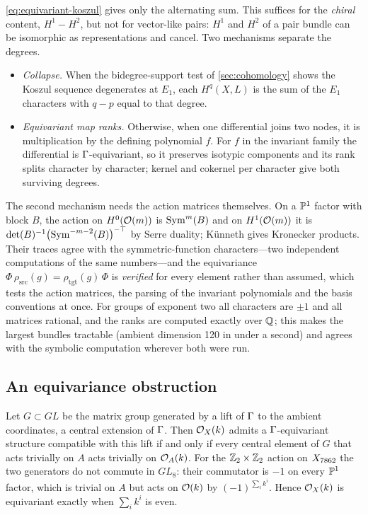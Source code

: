 \eqref{eq:equivariant-koszul} gives only the alternating sum. This suffices for
the \emph{chiral} content, $H^1-H^2$, but not for vector-like pairs: $H^1$ and
$H^2$ of a pair bundle can be isomorphic as representations and cancel. Two
mechanisms separate the degrees.

\begin{itemize}[leftmargin=*]
\item \emph{Collapse.} When the bidegree-support test of \cref{sec:cohomology}
  shows the Koszul sequence degenerates at $E_1$, each $H^q(X,L)$ is the sum of
  the $E_1$ characters with $q-p$ equal to that degree.
\item \emph{Equivariant map ranks.} Otherwise, when one differential joins two
  nodes, it is multiplication by the defining polynomial $f$. For $f$ in the
  invariant family the differential is $\Gamma$-equivariant, so it preserves
  isotypic components and its rank splits character by character; kernel and
  cokernel per character give both surviving degrees.
\end{itemize}

The second mechanism needs the action matrices themselves. On a $\mathbb{P}^1$ factor
with block $B$, the action on $H^0(\mathcal{O}(m))$ is $\operatorname{Sym}^m(B)$ and on
$H^1(\mathcal{O}(m))$ it is $\det(B)^{-1}\bigl(\operatorname{Sym}^{-m-2}(B)\bigr)^{-\top}$ by Serre
duality; Künneth gives Kronecker products. Their traces agree with the
symmetric-function characters---two independent computations of the same
numbers---and the equivariance $\Phi\,\rho_{\mathrm{src}}(g)=\rho_{\mathrm{tgt}}(g)\,\Phi$
is \emph{verified} for every element rather than assumed, which tests the action
matrices, the parsing of the invariant polynomials and the basis conventions at
once. For groups of exponent two all characters are $\pm1$ and all matrices
rational, and the ranks are computed exactly over $\mathbb{Q}$; this makes the largest
bundles tractable (ambient dimension 120 in under a second) and agrees with the
symbolic computation wherever both were run.

\subsection{An equivariance obstruction}

\begin{proposition}\label{prop:equivariance}
Let $G\subset GL$ be the matrix group generated by a lift of $\Gamma$ to the
ambient coordinates, a central extension of $\Gamma$. Then $\mathcal{O}_X(k)$ admits a
$\Gamma$-equivariant structure compatible with this lift if and only if every
central element of $G$ that acts trivially on $A$ acts trivially on
$\mathcal{O}_A(k)$. For the $\mathbb{Z}_2\times\mathbb{Z}_2$ action on $X_{7862}$ the two generators do not
commute in $GL_8$: their commutator is $-1$ on every $\mathbb{P}^1$ factor, which is
trivial on $A$ but acts on $\mathcal{O}(k)$ by $(-1)^{\sum_ik^i}$. Hence $\mathcal{O}_X(k)$ is
equivariant exactly when $\sum_ik^i$ is even.
\end{proposition}

